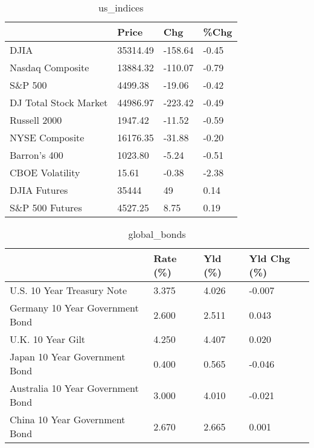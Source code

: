 \documentclass{article}%
\begin{document}
%


\begin{table}[htbp]%
\caption{us\_indices}%
\centering%
\begin{adjustbox}{width=1\textwidth}%
\begin{tabular}{llll}
\toprule
                      &    Price &     Chg &  \%Chg \\
\midrule
                 DJIA & 35314.49 & -158.64 & -0.45 \\
     Nasdaq Composite & 13884.32 & -110.07 & -0.79 \\
              S\&P 500 &  4499.38 &  -19.06 & -0.42 \\
DJ Total Stock Market & 44986.97 & -223.42 & -0.49 \\
         Russell 2000 &  1947.42 &  -11.52 & -0.59 \\
       NYSE Composite & 16176.35 &  -31.88 & -0.20 \\
         Barron's 400 &  1023.80 &   -5.24 & -0.51 \\
      CBOE Volatility &    15.61 &   -0.38 & -2.38 \\
         DJIA Futures &    35444 &      49 &  0.14 \\
      S\&P 500 Futures &  4527.25 &    8.75 &  0.19 \\
\bottomrule
\end{tabular}
%
\end{adjustbox}%
\end{table}

%


\begin{table}[htbp]%
\caption{global\_bonds}%
\centering%
\begin{adjustbox}{width=1\textwidth}%
\begin{tabular}{llll}
\toprule
                                  & Rate (\%) & Yld (\%) & Yld Chg (\%) \\
\midrule
       U.S. 10 Year Treasury Note &    3.375 &   4.026 &      -0.007 \\
  Germany 10 Year Government Bond &    2.600 &   2.511 &       0.043 \\
                U.K. 10 Year Gilt &    4.250 &   4.407 &       0.020 \\
    Japan 10 Year Government Bond &    0.400 &   0.565 &      -0.046 \\
Australia 10 Year Government Bond &    3.000 &   4.010 &      -0.021 \\
    China 10 Year Government Bond &    2.670 &   2.665 &       0.001 \\
\bottomrule
\end{tabular}
%
\end{adjustbox}%
\end{table}
\end{document}

